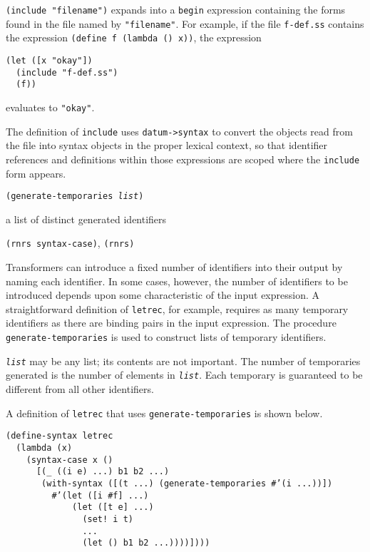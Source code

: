 \texttt{(include "filename")} expands into a \texttt{begin} expression
containing the forms found in the file named by
\texttt{"filename"}.
For example, if the file \texttt{f-def.ss} contains the expression
\texttt{(define f (lambda () x))}, the expression

\begin{alltt}
(let ([x "okay"])
  (include "f-def.ss")
  (f))
\end{alltt}


evaluates to \texttt{"okay"}.


The definition of \texttt{include} uses \texttt{datum-\textgreater{}syntax} to convert
the objects read from the file into syntax objects in the proper
lexical context, so that identifier references and definitions within
those expressions are scoped where the \texttt{include} form appears.

\begin{description}

\label{syntax_s49}\item[procedure] \texttt{(generate-temporaries \textit{list})}



\item[returns] a list of distinct generated identifiers


\item[libraries] \texttt{(rnrs syntax-case)}, \texttt{(rnrs)}
\end{description}


Transformers can introduce a fixed number of identifiers into their
output by naming each identifier.
In some cases, however, the number of identifiers to be introduced depends
upon some characteristic of the input expression.
A straightforward definition of \texttt{letrec}, for example,
requires as many
temporary identifiers as there are binding pairs in the
input expression.
The procedure \texttt{generate-temporaries} is used to construct
lists of temporary identifiers.

\texttt{\textit{list}} may be any list; its contents are not important.
The number of temporaries generated is the number of elements
in \texttt{\textit{list}}.
Each temporary is guaranteed to be different from all other
identifiers.

A definition of \label{syntax_s50}\texttt{letrec} that
uses \texttt{generate-temporaries} is shown below.


\begin{alltt}
(define-syntax letrec\label{syntax_defn_letrec}
  (lambda (x)
    (syntax-case x ()
      [(\_{} ((i e) ...) b1 b2 ...)
       (with-syntax ([(t ...) (generate-temporaries \#{}'(i ...))])
         \#{}'(let ([i \#{}f] ...)
             (let ([t e] ...)
               (set! i t)
               ...
               (let () b1 b2 ...))))])))
\end{alltt}


